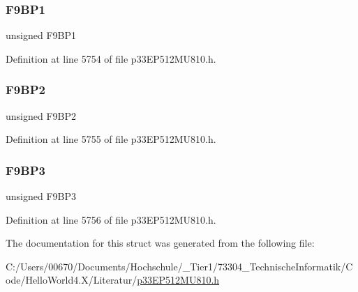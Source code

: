 \subsubsection{\texorpdfstring{F9\+B\+P1}{F9BP1}}
{\footnotesize\ttfamily unsigned F9\+B\+P1}



Definition at line 5754 of file p33\+E\+P512\+M\+U810.\+h.

\mbox{\label{structtag_c2_b_u_f_p_n_t3_b_i_t_s_a5c10af0ab5f0f9eb1e07746455e5987b}} 
\subsubsection{\texorpdfstring{F9\+B\+P2}{F9BP2}}
{\footnotesize\ttfamily unsigned F9\+B\+P2}



Definition at line 5755 of file p33\+E\+P512\+M\+U810.\+h.

\mbox{\label{structtag_c2_b_u_f_p_n_t3_b_i_t_s_a7263710482a0ec8923783f6900197e3d}} 
\subsubsection{\texorpdfstring{F9\+B\+P3}{F9BP3}}
{\footnotesize\ttfamily unsigned F9\+B\+P3}



Definition at line 5756 of file p33\+E\+P512\+M\+U810.\+h.



The documentation for this struct was generated from the following file\+:\begin{DoxyCompactItemize}
\item 
C\+:/\+Users/00670/\+Documents/\+Hochschule/\+\_\+\+Tier1/73304\+\_\+\+Technische\+Informatik/\+Code/\+Hello\+World4.\+X/\+Literatur/\hyperlink{p33_e_p512_m_u810_8h}{p33\+E\+P512\+M\+U810.\+h}\end{DoxyCompactItemize}
